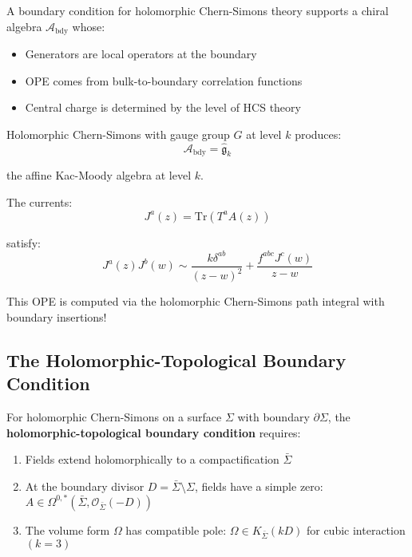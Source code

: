 \begin{theorem}
A boundary condition for holomorphic Chern-Simons theory supports a chiral 
algebra $\mathcal{A}_{\text{bdy}}$ whose:
\begin{itemize}
\item Generators are local operators at the boundary
\item OPE comes from bulk-to-boundary correlation functions
\item Central charge is determined by the level of HCS theory
\end{itemize}
\end{theorem}

\begin{example}
Holomorphic Chern-Simons with gauge group $G$ at level $k$ produces:
$$\mathcal{A}_{\text{bdy}} = \widehat{\mathfrak{g}}_k$$

the affine Kac-Moody algebra at level $k$.

The currents:
$$J^a(z) = \text{Tr}(T^a A(z))$$

satisfy:
$$J^a(z) J^b(w) \sim \frac{k \delta^{ab}}{(z-w)^2} + 
\frac{f^{abc} J^c(w)}{z-w}$$

This OPE is computed via the holomorphic Chern-Simons path integral with 
boundary insertions!
\end{example}

\subsection{The Holomorphic-Topological Boundary Condition}

\begin{definition}
For holomorphic Chern-Simons on a surface $\Sigma$ with boundary $\partial \Sigma$, 
the \textbf{holomorphic-topological boundary condition} requires:
\begin{enumerate}
\item Fields extend holomorphically to a compactification $\bar{\Sigma}$
\item At the boundary divisor $D = \bar{\Sigma} \setminus \Sigma$, fields have 
a simple zero: $A \in \Omega^{0,*}(\bar{\Sigma}, \mathcal{O}_{\bar{\Sigma}}(-D))$
\item The volume form $\Omega$ has compatible pole: $\Omega \in K_{\bar{\Sigma}}(kD)$ 
for cubic interaction $(k=3)$
\end{enumerate}
\end{definition}

